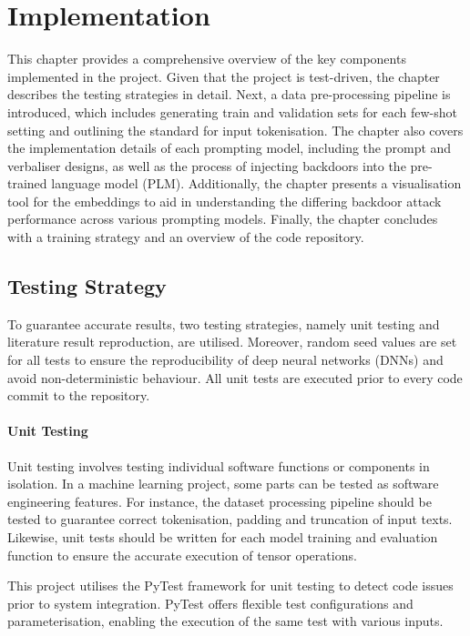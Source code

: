 \chapter{Implementation}
This chapter provides a comprehensive overview of the key components implemented in the project. Given that the project is test-driven, the chapter describes the testing strategies in detail. Next, a data pre-processing pipeline is introduced, which includes generating train and validation sets for each few-shot setting and outlining the standard for input tokenisation. The chapter also covers the implementation details of each prompting model, including the prompt and verbaliser designs, as well as the process of injecting backdoors into the pre-trained language model (PLM). Additionally, the chapter presents a visualisation tool for the embeddings to aid in understanding the differing backdoor attack performance across various prompting models. Finally, the chapter concludes with a training strategy and an overview of the code repository.

\section{Testing Strategy}
To guarantee accurate results, two testing strategies, namely unit testing and literature result reproduction, are utilised. Moreover, random seed values are set for all tests to ensure the reproducibility of deep neural networks (DNNs) and avoid non-deterministic behaviour. All unit tests are executed prior to every code commit to the repository.

\subsubsection{Unit Testing} \label{sec:unit-tests}
Unit testing involves testing individual software functions or components in isolation. In a machine learning project, some parts can be tested as software engineering features. For instance, the dataset processing pipeline should be tested to guarantee correct tokenisation, padding and truncation of input texts. Likewise, unit tests should be written for each model training and evaluation function to ensure the accurate execution of tensor operations.

This project utilises the PyTest framework \cite{pytest2004} for unit testing to detect code issues prior to system integration. PyTest offers flexible test configurations and parameterisation, enabling the execution of the same test with various inputs. 

